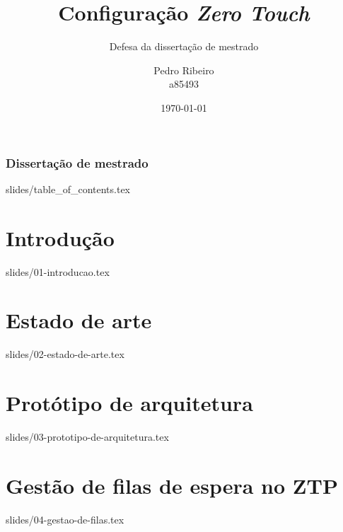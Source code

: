 \documentclass{beamer}
\title{Configuração \textit{Zero Touch}}
\begin{document}
\author[Pedro Ribeiro]{
    \parbox{2.5cm}{%
        \centering Pedro Ribeiro\\a85493
    }%
}


\subtitle{\tiny{Defesa da dissertação de mestrado}}


\date{\today}


\begin{frame}
    \frametitle{Dissertação de mestrado}
    \titlepage
\end{frame}

{slides/table_of_contents.tex}

\section{Introdução}
{slides/01-introducao.tex}

\section{Estado de arte}
{slides/02-estado-de-arte.tex}

\section{Protótipo de arquitetura}
{slides/03-prototipo-de-arquitetura.tex}

\section{Gestão de filas de espera no ZTP}
{slides/04-gestao-de-filas.tex}
\end{document}
